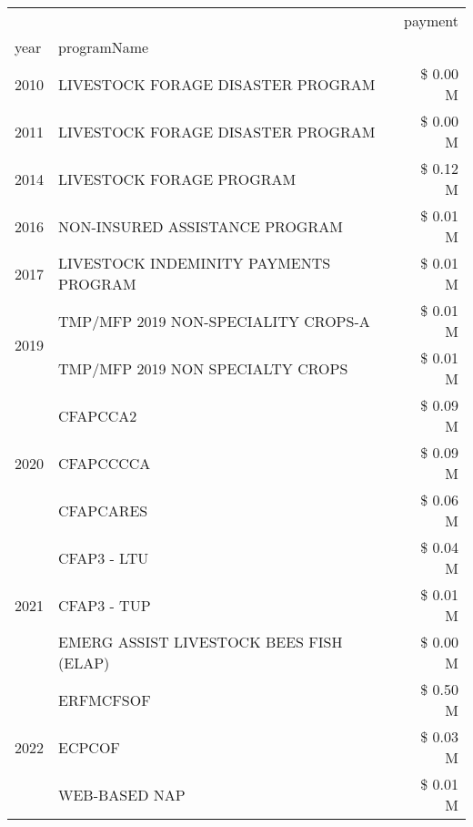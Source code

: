 \begin{tabular}{llr}
\toprule
 &  & payment \\
year & programName &  \\
\midrule
2010 & LIVESTOCK FORAGE DISASTER PROGRAM & \$ 0.00 M \\
\cline{1-3}
2011 & LIVESTOCK FORAGE DISASTER PROGRAM & \$ 0.00 M \\
\cline{1-3}
2014 & LIVESTOCK FORAGE PROGRAM & \$ 0.12 M \\
\cline{1-3}
2016 & NON-INSURED ASSISTANCE PROGRAM & \$ 0.01 M \\
\cline{1-3}
2017 & LIVESTOCK INDEMINITY PAYMENTS PROGRAM & \$ 0.01 M \\
\cline{1-3}
\multirow[t]{2}{*}{2019} & TMP/MFP 2019 NON-SPECIALITY CROPS-A & \$ 0.01 M \\
 & TMP/MFP 2019 NON SPECIALTY CROPS & \$ 0.01 M \\
\cline{1-3}
\multirow[t]{3}{*}{2020} & CFAPCCA2 & \$ 0.09 M \\
 & CFAPCCCCA & \$ 0.09 M \\
 & CFAPCARES & \$ 0.06 M \\
\cline{1-3}
\multirow[t]{3}{*}{2021} & CFAP3 - LTU & \$ 0.04 M \\
 & CFAP3 - TUP & \$ 0.01 M \\
 & EMERG ASSIST LIVESTOCK BEES FISH (ELAP) & \$ 0.00 M \\
\cline{1-3}
\multirow[t]{3}{*}{2022} & ERFMCFSOF & \$ 0.50 M \\
 & ECPCOF & \$ 0.03 M \\
 & WEB-BASED NAP & \$ 0.01 M \\
\cline{1-3}
\bottomrule
\end{tabular}
